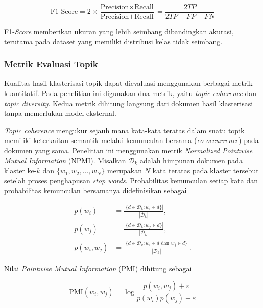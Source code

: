 \begin{equation}
    \text{F1-Score}
    =
    2
    \times
    \frac{\text{Precision} \times \text{Recall}}
    {\text{Precision} + \text{Recall}}
    =
    \frac{2TP}{2TP + FP + FN}
    \label{eq:f1score}
\end{equation}

F1-\textit{Score} memberikan ukuran yang lebih seimbang dibandingkan
akurasi, terutama pada dataset yang memiliki distribusi kelas tidak
seimbang.

\subsubsection{Metrik Evaluasi Topik}
\label{sec:topic_eval}

Kualitas hasil klasterisasi topik dapat dievaluasi menggunakan berbagai
metrik kuantitatif. Pada penelitian ini digunakan dua metrik, yaitu
\textit{topic coherence} dan \textit{topic diversity}. Kedua metrik
dihitung langsung dari dokumen hasil klasterisasi tanpa memerlukan model
eksternal.

\textit{Topic coherence} mengukur sejauh mana kata-kata teratas dalam
suatu topik memiliki keterkaitan semantik melalui kemunculan bersama
(\textit{co-occurrence}) pada dokumen yang sama. Penelitian ini
menggunakan metrik \textit{Normalized Pointwise Mutual Information}
(NPMI). Misalkan $\mathcal{D}_k$ adalah himpunan dokumen pada klaster
ke-$k$ dan $\{w_1,w_2,\ldots,w_N\}$ merupakan $N$ kata teratas pada
klaster tersebut setelah proses penghapusan \textit{stop words}.
Probabilitas kemunculan setiap kata dan probabilitas kemunculan
bersamanya didefinisikan sebagai

\begin{align}
    p(w_i)
    &= \frac{|\{d \in \mathcal{D}_k : w_i \in d\}|}
    {|\mathcal{D}_k|},\\[4pt]
    p(w_j)
    &= \frac{|\{d \in \mathcal{D}_k : w_j \in d\}|}
    {|\mathcal{D}_k|},\\[4pt]
    p(w_i,w_j)
    &= \frac{|\{d \in \mathcal{D}_k :
    w_i \in d \text{ dan } w_j \in d\}|}
    {|\mathcal{D}_k|}.
\end{align}

Nilai \textit{Pointwise Mutual Information} (PMI) dihitung sebagai

\begin{equation}
    \mathrm{PMI}(w_i,w_j)
    =
    \log
    \frac{p(w_i,w_j)+\varepsilon}
    {p(w_i)p(w_j)+\varepsilon}
    \label{eq:pmi}
\end{equation}

